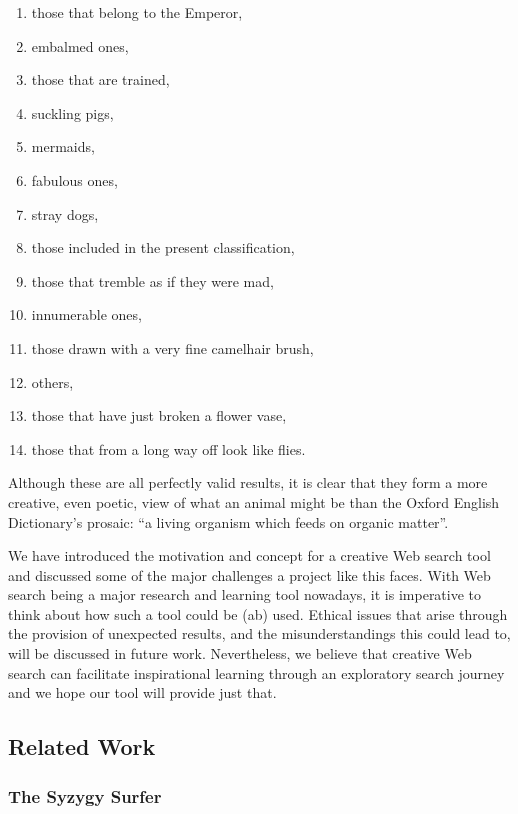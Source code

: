 \begin{enumerate}
  \item those that belong to the Emperor,
  \item embalmed ones,
  \item those that are trained,
  \item suckling pigs,
  \item mermaids,
  \item fabulous ones,
  \item stray dogs,
  \item those included in the present classification,
  \item those that tremble as if they were mad,
  \item innumerable ones,
  \item those drawn with a very fine camelhair brush,
  \item others,
  \item those that have just broken a flower vase,
  \item those that from a long way off look like flies.
\end{enumerate}

Although these are all perfectly valid results, it is clear that they form a more creative, even poetic, view of what an animal might be than the Oxford English Dictionary's prosaic: ``a living organism which feeds on organic matter''.

We have introduced the motivation and concept for a creative Web search tool and discussed some of the major challenges a project like this faces. With Web search being a major research and learning tool nowadays, it is imperative to think about how such a tool could be (ab) used. Ethical issues that arise through the provision of unexpected results, and the misunderstandings this could lead to, will be discussed in future work. Nevertheless, we believe that creative Web search can facilitate inspirational learning through an exploratory search journey and we hope our tool will provide just that.


\subsection{Related Work}


\subsubsection*{The Syzygy Surfer}

